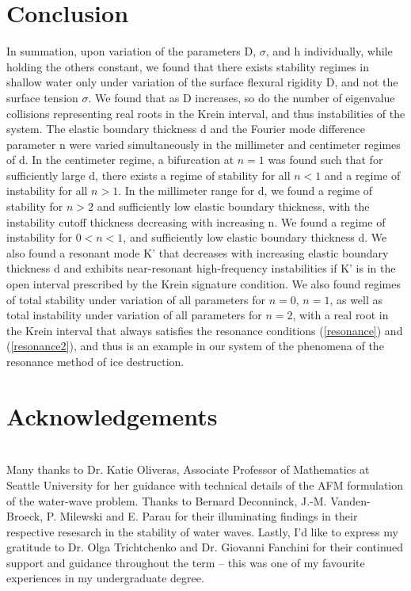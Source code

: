 \documentclass{article}
\begin{document}
\section{Conclusion}

In summation, upon variation of the parameters D, \(\sigma\), and h individually, while holding the others constant, we found that there exists stability regimes in shallow water only under variation of the surface flexural rigidity D, and not the surface tension \(\sigma\). We found that as D increases, so do the number of eigenvalue collisions representing real roots in the Krein interval, and thus instabilities of the system. The elastic boundary thickness d and the Fourier mode difference parameter n were varied simultaneously in the millimeter and centimeter regimes of d. In the centimeter regime, a bifurcation at \(n = 1\) was found such that for sufficiently large d, there exists a regime of stability for all \(n<1\) and a regime of instability for all \(n>1\). In the millimeter range for d, we found a regime of stability for \(n>2\) and sufficiently low elastic boundary thickness, with the instability cutoff thickness decreasing with increasing n. We found a regime of instability for \(0 < n < 1\), and sufficiently low elastic boundary thickness d. We also found a resonant mode K' that decreases with increasing elastic boundary thickness d and exhibits near-resonant high-frequency instabilities if K' is in the open interval prescribed by the Krein signature condition. We also found regimes of total stability under variation of all parameters for \(n = 0\), \(n = 1\), as well as total instability under variation of all parameters for \(n = 2\), with a real root in the Krein interval that always satisfies the resonance conditions (\ref{resonance}) and (\ref{resonance2}), and thus is an example in our system of the phenomena of the resonance method of ice destruction. 
\\

\section{Acknowledgements}
\\ 
Many thanks to Dr. Katie Oliveras, Associate Professor of Mathematics at Seattle University for her guidance with technical details of the AFM formulation of the water-wave problem. Thanks to Bernard Deconninck, J.-M. Vanden-Broeck, P. Milewski and E. Parau for their illuminating findings in their respective resesarch in the stability of water waves. Lastly, I'd like to express my gratitude to Dr. Olga Trichtchenko and Dr. Giovanni Fanchini for their continued support and guidance throughout the term -- this was one of my favourite experiences in my undergraduate degree.
\end{document}
